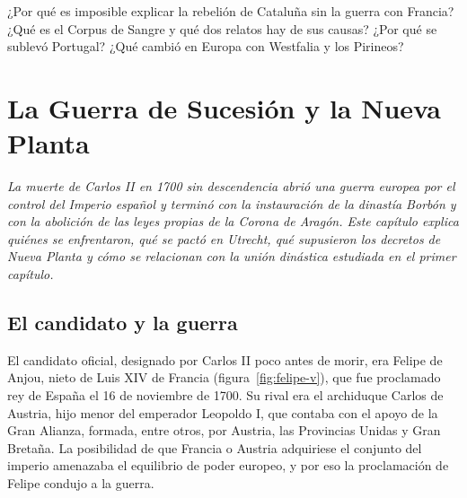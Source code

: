 \documentclass{book}
\begin{document}
\begin{tcolorbox}[title={Autoficha}, studiumcheck, breakable]

¿Por qué es imposible explicar la rebelión de Cataluña sin la guerra con Francia? ¿Qué es el Corpus de Sangre y qué dos relatos hay de sus causas? ¿Por qué se sublevó Portugal? ¿Qué cambió en Europa con Westfalia y los Pirineos?

\end{tcolorbox}

\chapter{La Guerra de Sucesión y la Nueva Planta}
\label{chap:hist-06}

\noindent\textit{La muerte de Carlos II en 1700 sin descendencia abrió una guerra europea por el control del Imperio español y terminó con la instauración de la dinastía Borbón y con la abolición de las leyes propias de la Corona de Aragón. Este capítulo explica quiénes se enfrentaron, qué se pactó en Utrecht, qué supusieron los decretos de Nueva Planta y cómo se relacionan con la unión dinástica estudiada en el primer capítulo.}


\section{El candidato y la guerra}

El candidato oficial, designado por Carlos II poco antes de morir, era Felipe de Anjou, nieto de Luis XIV de Francia (figura~\ref{fig:felipe-v}), que fue proclamado rey de España el 16 de noviembre de 1700. Su rival era el archiduque Carlos de Austria, hijo menor del emperador Leopoldo I, que contaba con el apoyo de la Gran Alianza, formada, entre otros, por Austria, las Provincias Unidas y Gran Bretaña. La posibilidad de que Francia o Austria adquiriese el conjunto del imperio amenazaba el equilibrio de poder europeo, y por eso la proclamación de Felipe condujo a la guerra.

\end{document}
